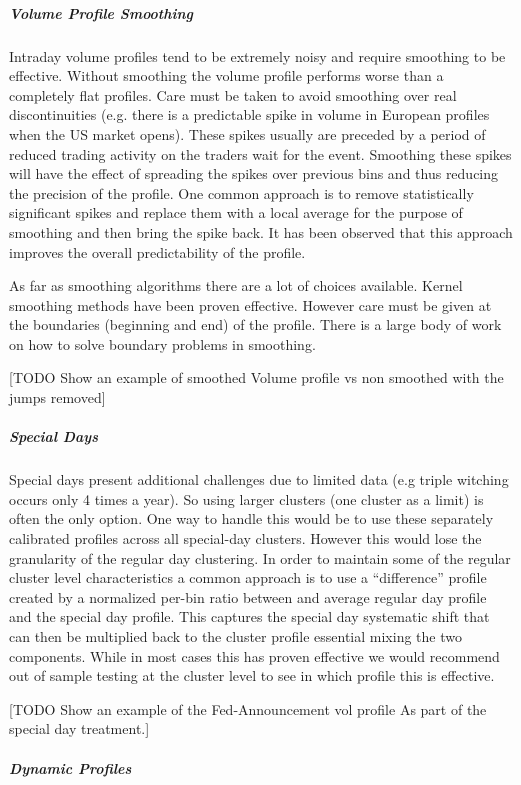 \subparagraph{Volume Profile Smoothing}

Intraday volume profiles tend to be extremely noisy and require smoothing to be effective. Without smoothing the volume profile performs worse than a completely flat profiles. Care must be taken to avoid smoothing over real discontinuities (e.g. there is a predictable spike in volume in European profiles when the US market opens). These spikes usually are preceded by a period of reduced trading activity on the traders wait for the event. Smoothing these spikes will have the effect of spreading the spikes over previous bins and thus reducing the precision of the profile. One common approach is to remove statistically significant spikes and replace them with a local average for the purpose of smoothing and then bring the spike back. It has been observed that this approach improves the overall predictability of the profile. 


As far as smoothing algorithms there are a lot of choices available. Kernel smoothing methods have been proven effective. However  care must be given at the boundaries (beginning and end) of the profile. There is a large body of work on how to solve boundary problems in smoothing.


[TODO Show an example of smoothed Volume profile vs non smoothed with the jumps removed]


\subparagraph{Special Days}

Special days present additional challenges due to limited data (e.g triple witching occurs only 4 times a year). So using larger clusters (one cluster as a limit) is often the only option. One way to handle this would be to use these separately calibrated profiles across all special-day clusters. However this would lose the granularity of the regular day clustering. In order to maintain some of the  regular cluster level characteristics a common approach is to use a ``difference'' profile created by a normalized per-bin ratio between and average regular day profile and the special day profile. This captures the special day systematic shift that can then be multiplied back to the cluster profile essential mixing the two components. While in most cases this has proven effective we would recommend out of sample testing at the cluster level to see in which profile this is effective.


[TODO Show an example of the Fed-Announcement vol profile As part of the special day treatment.]

\subparagraph{Dynamic Profiles}

